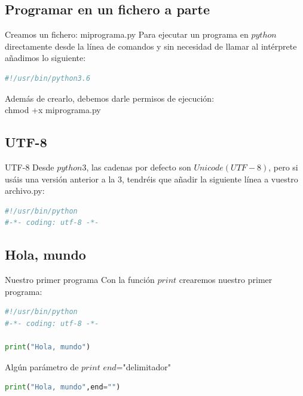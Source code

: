 \documentclass{beamer}
\begin{document}
\subsection{Programar en un fichero a parte}
\begin{frame}[fragile]
\begin{block}{Creamos un fichero: miprograma.py}
Para ejecutar un programa en $python$ directamente desde la línea de comandos y sin necesidad de llamar al intérprete añadimos lo siguiente:
\end{block}
\begin{lstlisting}[language=Python]
#!/usr/bin/python3.6
\end{lstlisting}
\pause
\begin{block}{}
Además de crearlo, debemos darle permisos de ejecución: \\
chmod +x miprograma.py
\end{block}

\end{frame}
\subsection{UTF-8}
\begin{frame}[fragile]
\begin{block}{UTF-8}
Desde $python3$, las cadenas por defecto son $Unicode(UTF-8)$, pero si usáis una versión anterior a la 3, tendréis que añadir la siguiente línea a vuestro archivo.py:
\end{block}
\begin{lstlisting}[language=Python]
#!/usr/bin/python
#-*- coding: utf-8 -*-
\end{lstlisting}
\end{frame}
\subsection{Hola, mundo}
\begin{frame}[fragile]
\begin{block}{Nuestro primer programa}
Con la función $print$ crearemos nuestro primer programa:
\end{block}
\begin{lstlisting}[language=Python]
#!/usr/bin/python
#-*- coding: utf-8 -*-

print("Hola, mundo")
\end{lstlisting}
\pause
\begin{exampleblock}{Algún parámetro de $print$}
$end$="delimitador"
\end{exampleblock}
\begin{lstlisting}[language=Python]
print("Hola, mundo",end="")
\end{lstlisting}
\end{frame}
\end{document}
